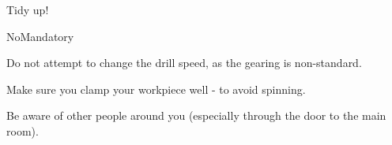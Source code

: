 \documentclass[11pt, oneside]{book}
\begin{document}
	{}%
	{Tidy up!} %
	{%
	}
	{%
	
	}
	{NoMandatory}%
	{Do not attempt to change the drill speed, as the gearing is non-standard.
	
Make sure you clamp your workpiece well - to avoid spinning.

Be aware of other people around you (especially through the door to the main room).
} %
\end{document}
